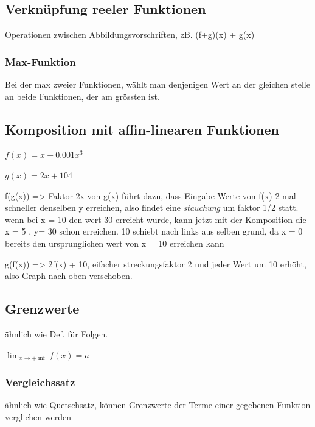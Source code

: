 
\subsection{Verknüpfung reeler Funktionen}

Operationen zwischen Abbildungsvorschriften, zB. (f+g)(x) + g(x)

\subsubsection{Max-Funktion}

Bei der max zweier Funktionen, wählt man denjenigen Wert an der gleichen stelle an beide Funktionen, der am grössten ist.


\subsection{Komposition mit affin-linearen Funktionen}

$f(x) = x - 0.001x^3$

$g(x) = 2x + 10 $4

f(g(x)) => Faktor 2x von g(x) führt dazu, dass Eingabe Werte von f(x) 2 mal schneller denselben y erreichen, also findet eine \textit{stauchung} um faktor 1/2 statt. wenn bei x = 10 den wert 30 erreicht wurde, kann jetzt mit der Komposition die x = 5 , y= 30 schon erreichen. 10 schiebt nach links aus selben grund, da x = 0 bereits den ursprunglichen wert von x = 10 erreichen kann


g(f(x)) => 2f(x) + 10, eifacher streckungsfaktor 2 und jeder Wert um 10 erhöht, also Graph nach oben verschoben.

\subsection{Grenzwerte}
\begin{definition}
     ähnlich wie Def. für Folgen.
    
       $ \lim_{x \rightarrow + \inf} f(x) = a$ 
\end{definition}

\subsubsection{Vergleichssatz}
ähnlich wie Quetschsatz, können Grenzwerte der Terme einer gegebenen Funktion verglichen werden

